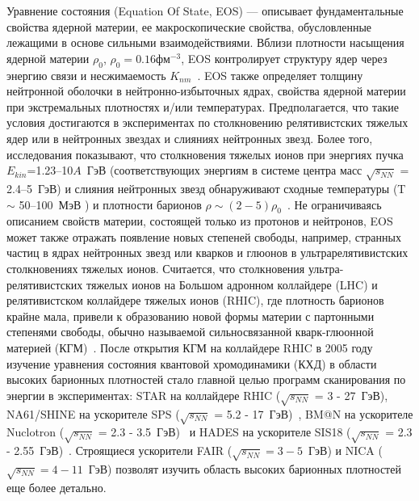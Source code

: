 {\actuality} Уравнение состояния (Equation Of State, EOS) --- описывает фундаментальные свойства ядерной материи, ее  макроскопические свойства, обусловленные лежащими в основе сильными взаимодействиями.  
Вблизи плотности насыщения ядерной материи $\rho_{0}$, $\rho_{0}=0.16 фм^{-3}$,  EOS контролирует структуру ядер через энергию связи и несжимаемость $K_{nm}$~\cite[B][]{Danielewicz:2002pu}.
EOS также определяет толщину нейтронной оболочки в нейтронно-избыточных ядрах, свойства ядерной материи при экстремальных плотностях и/или температурах.
Предполагается, что такие условия достигаются в экспериментах по столкновению релятивистских тяжелых ядер или в нейтронных звездах и слияниях нейтронных звезд. 
Более того, исследования показывают, что столкновения тяжелых ионов при энергиях пучка  $E_{kin}$=1.23--10$A$~ГэВ (соответствующих энергиям в системе центра масс $\sqrt{s_{NN}}$ = 2.4--5~ГэВ)  и слияния нейтронных звезд обнаруживают сходные температуры (T $\sim$  50--100~МэВ ) и плотности барионов $\rho \sim (2-5)\rho_{0}$~\cite{Bzdak:2019pkr,Xu:2022mqn}.
Не ограничиваясь описанием свойств материи, состоящей только из протонов и нейтронов, EOS может также отражать появление новых степеней свободы, например, странных частиц в ядрах нейтронных звезд или кварков и глюонов в ультрарелятивистских столкновениях тяжелых ионов. 
Считается, что столкновения ультра-релятивистских тяжелых ионов на Большом адронном коллайдере (LHC) и релятивистском коллайдере тяжелых ионов (RHIC), где  плотность барионов крайне мала, привели к образованию новой формы материи с партонными степенями свободы, обычно называемой сильносвязанной кварк-глюонной материей (КГМ)~\cite{Esumi:2022uas}.
После открытия КГМ на коллайдере RHIC в 2005 году изучение уравнения состояния  квантовой хромодинамики (КХД) в области высоких барионных плотностей стало главной целью программ сканирования по энергии в экспериментах: STAR на коллайдере RHIC ($\sqrt{s_{NN}}$ = 3 - 27~ГэВ), NA61/SHINE на ускорителе  SPS ($\sqrt{s_{NN}}$ = 5.2 - 17~ГэВ)~\cite{NA61:2014lfx}, BM@N на ускорителе Nuclotron ($\sqrt{s_{NN}}$ = 2.3 - 3.5~ГэВ)~\cite{Senger:2022bzm} и   HADES на ускорителе  SIS18 ($\sqrt{s_{NN}}$ = 2.3 - 2.55~ГэВ)~\cite{HADES:2009aat}. 
Строящиеся ускорители FAIR ($\sqrt{s_{NN}}=3-5$~ГэВ) и NICA ($\sqrt{s_{NN}}=4-11$~ГэВ)  позволят изучить  область высоких барионных плотностей еще более детально.

